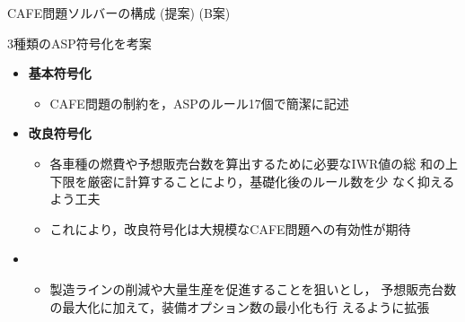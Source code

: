 \documentclass[dvipdfmx, 11pt]{beamer}
\begin{document}
 \begin{frame}{CAFE問題ソルバーの構成 (提案) \alert{(B案)}}
   \scalebox{0.9}{\centering}
   \begin{block}{3種類のASP符号化を考案}
     \begin{itemize}
     \item \alert{\bf 基本符号化}
       \begin{itemize}
       \item CAFE問題の制約を，ASPのルール17個で簡潔に記述
       \end{itemize}
     \item \alert{\bf 改良符号化}
       \begin{itemize}
       \item 各車種の燃費や予想販売台数を算出するために必要なIWR値の総
         和の上下限を厳密に計算することにより，基礎化後のルール数を少
         なく抑えるよう工夫
       \item これにより，改良符号化は大規模なCAFE問題への有効性が期待
       \end{itemize}
     \item {}
       \begin{itemize}
         \item 製造ラインの削減や大量生産を促進することを狙いとし，
           予想販売台数の最大化に加えて，装備オプション数の最小化も行
           えるように拡張
       \end{itemize}
     \end{itemize}
   \end{block}
 \end{frame}
\end{document}

